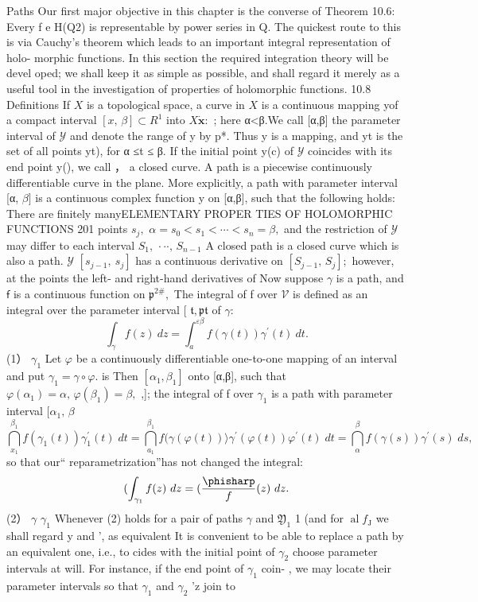 Paths Our first major objective in this chapter is the converse of Theorem 10.6: Every f e H(Q2) is representable by power series in Q. The quickest route to this is via Cauchy's theorem which leads to an important integral representation of holo- morphic functions. In this section the required integration theory will be devel oped; we shall keep it as simple as possible, and shall regard it merely as a useful tool in the investigation of properties of holomorphic functions. 10.8 Definitions If $X$ is a topological space, a curve in $X$ is a continuous mapping yof a compact interval $[x,\,\beta]\subset R^{1}$ into $X{\dot{\boldsymbol{x}}}:$ ; here α<β.We call [α,β] the parameter interval of $\scriptstyle{\mathcal{Y}}$ and denote the range of y by p*. Thus y is a mapping, and yt is the set of all points yt), for α ≤t ≤ β. If the initial point y(c) of $\scriptstyle{\mathcal{Y}}$ coincides with its end point y(), we call ， a closed curve. A path is a piecewise continuously differentiable curve in the plane. More explicitly, a path with parameter interval [α, $\beta]$ is a continuous complex function y on [α,β], such that the following holds: There are finitely manyELEMENTARY PROPER TIES OF HOLOMORPHIC FUNCTIONS 201 points $s_{j},$ $\alpha=s_{0}<s_{1}<\cdots<s_{n}=\beta,$ and the restriction of $\scriptstyle{\mathcal{Y}}$ may differ to each interval $S_{1},\,\cdot\cdot\cdot,\,S_{n-1}$ A closed path is a closed curve which is also a path. $\scriptstyle{\mathcal{Y}}$ $\left[s_{j-1},\ s_{j}\right]$ has a continuous derivative on $\textstyle\left[S_{j-1},\,S_{j}\right];$ however, at the points the left- and right-hand derivatives of Now suppose $\scriptstyle\gamma$ is a path, and $\boldsymbol{\mathsf{f}}$ is a continuous function on $\mathfrak{p}^{\mathrm{2}\#},$ The integral of f over $\scriptstyle{\mathcal{V}}$ is defined as an integral over the parameter interval [ ${\mathfrak{t}},{\mathfrak{p}}{\mathfrak{t}}$ of $\gamma\colon$ $$ \int_{\gamma}f(z)\ d{z}=\int_{a}^{\varepsilon\beta}f(\gamma(t))\gamma^{\prime}(t)\ d{t}. $$ (1） $\gamma_{1}$ Let $\varphi$ be a continuously differentiable one-to-one mapping of an interval and put $\gamma_{1}=\gamma\circ\varphi.$ is Then $[\alpha_{1},\beta_{1}]$ onto [α,β], such that $\varphi(\alpha_{1})=\alpha,\,\varphi(\beta_{1})=\beta,$ ,]; the integral of f over $\gamma_{1}$ is a path with parameter interval $[\alpha_{1},\,\beta$ $$ \bigcap_{x_{1}}^{\beta_{1}}f(\gamma_{1}(t))\gamma_{1}^{\prime}(t)\;d t= \bigcap_{a_{1}}^{\beta_{1}}f(\gamma(\varphi(t)) \rangle\gamma^{\prime}(\varphi(t))\varphi^{\prime}(t)\;d t= \bigcap_{\alpha}^{\beta}f(\gamma(s))\gamma^{\prime}(s)\;d s, $$ so that our“ reparametrization”has not changed the integral: $$ (\int_{\gamma_{1}}f(z)\ d z= (\frac\phisharp f(z)\ d z. $$ (2） $\gamma$ $\gamma_{1}$ Whenever (2) holds for a pair of paths $\scriptstyle\gamma$ and ${\mathfrak{Y}}_{1}$ 1 (and for $\operatorname{al}f_{\mathrm{{J}}}$ we shall regard y and ', as equivalent It is convenient to be able to replace a path by an equivalent one, i.e., to cides with the initial point of $\gamma_{2}$ choose parameter intervals at will. For instance, if the end point of $\gamma_{1}$ coin- , we may locate their parameter intervals so that $\gamma_{1}$ and $\gamma_{2}$ 'z join to 